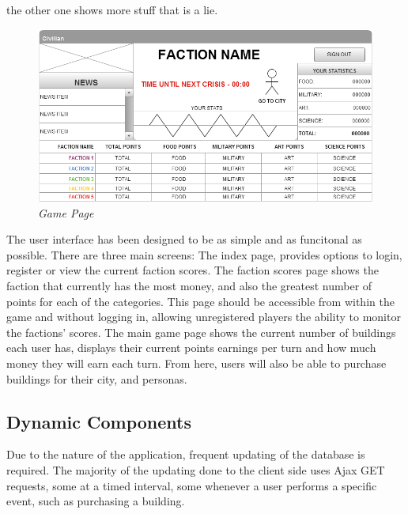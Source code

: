 \documentclass{sig-alt-release2}
\begin{document}
the other one shows more stuff that is a lie.

\begin{figure}[!htbp]
  \caption{\textit{Game Page}}
  \begin{center}
		\includegraphics[scale=0.25]{img/w4.png}
  \end{center}
\end{figure}

The user interface has been designed to be as simple and as funcitonal as possible. 
There are three main screens: 
The index  page, provides options to login, register or view the current faction scores.
The faction scores page shows the faction that currently has the most money, and also the greatest number of points for each of the categories. This page should be accessible from within the game and without logging in, allowing unregistered players the ability to monitor the factions' scores.
The main game page shows the current number of buildings each user has, displays their current points earnings per turn and how much money they will earn each turn. From here, users will also be able to purchase buildings for their city, and personas.

\subsection{Dynamic Components}
Due to the nature of the application, frequent updating of the database is required. The majority of the updating done to the client side uses Ajax GET requests, some at a timed interval, some whenever a user performs a specific event, such as purchasing a building.
\end{document}
